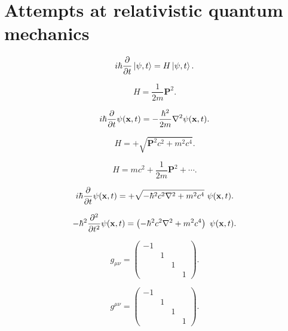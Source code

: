 \section{Attempts at relativistic quantum mechanics}

\begin{equation}
	i\hbar \frac{\partial{}}{\partial{t}}\left| \psi, t \right\rangle = H \left| \psi, t \right\rangle.
\end{equation}

\begin{equation}
	H = \frac{1}{2m} \mathbf{P}^2.
\end{equation}

\begin{equation}
	i\hbar \frac{\partial{}}{\partial{t}}\psi(\mathbf{x}, t)= -\frac{\hbar^2}{2m} \nabla^2 \psi(\mathbf{x}, t).
\end{equation}

\begin{equation}
	H = + \sqrt{\mathbf{P}^2 c^2 + m^2 c^4}.
\end{equation}

\begin{equation}
	H = mc^2 + \frac{1}{2m}\mathbf{P}^2 + \cdots.
\end{equation}

\begin{equation}
	i\hbar \frac{\partial{}}{\partial{t}} \psi(\mathbf{x}, t) = + \sqrt{- \hbar^2 c^2 \nabla^2 + m^2 c^4}\ \psi(\mathbf{x}, t).
\end{equation}

\begin{equation}
	- \hbar^2 \pdfrac{{}^2}{t^2} \psi(\mathbf{x}, t) = \left( - \hbar^2 c^2 \nabla^2 + m^2 c^4 \right) \ \psi(\mathbf{x}, t)	.
\end{equation}

\begin{equation}
	g_{\mu\nu} = 
	\begin{pmatrix}
		-1 & & & \\
		& 1 & & \\
		& & 1 & \\
		& & & 1
	\end{pmatrix}.
\end{equation}

\begin{equation}
	g^{\mu\nu} = 
	\begin{pmatrix}
		-1 & & & \\
		& 1 & & \\
		& & 1 & \\
		& & & 1
	\end{pmatrix}.
\end{equation}

